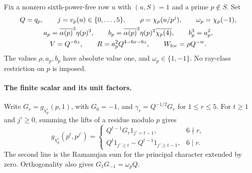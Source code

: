 \documentclass[12pt]{article}
\begin{document}
Fix a nonzero sixth-power-free row $u$ with $(u,S)=1$ and a prime
$p\notin S$.  Set
\begin{equation}\label{eq:local-parameters}
 \begin{gathered}
 Q=q_p,\qquad j=v_p(u)\in\{0,\ldots,5\},\qquad
 \rho=\chi_p(u/p^j),\qquad \omega_p=\chi_p(-1),\\
 a_p=\overline{\alpha(p)}^3\eta(p)^3,\qquad
 b_p=\overline{\alpha(p)}^2\eta(p)^2\overline{\chi_p(4)},
 \qquad b_p^3=a_p^2,\\
 V=Q^{-6z},\qquad R=a_p^2Q^{4-6x-6z},\qquad
 W_{\rm loc}=\rho Q^{-w}.
 \end{gathered}
\end{equation}
The values $\rho,a_p,b_p$ have absolute value one, and
$\omega_p\in\{1,-1\}$.  No ray-class restriction on $p$ is imposed.

\paragraph{The finite scalar and its unit factors.}
Write $G_r=g_{\chi_p^r}(p,1)$, with $G_0=-1$, and
$\gamma_r=Q^{-1/2}G_r$ for $1\le r\le5$.  For $t\ge1$ and
$j'\ge0$, summing the lifts of a residue modulo $p$ gives
\[
 g_{\chi_p^r}(p^t,p^{j'})=
 \begin{cases}
 Q^{t-1}G_r1_{j'=t-1},&6\nmid r,\\
 Q^t1_{j'\ge t}-Q^{t-1}1_{j'\ge t-1},&6\mid r.
 \end{cases}
\]
The second line is the Ramanujan sum for the principal character
extended by zero.  Orthogonality also gives
$G_1G_{-1}=\omega_pQ$.
\end{document}
